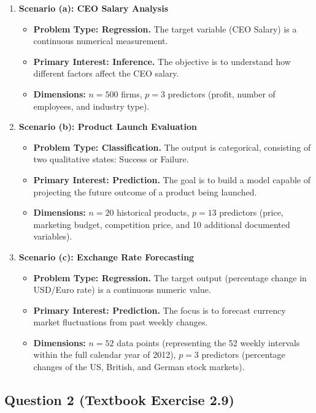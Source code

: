 \documentclass[12pt,a4paper]{article}
\begin{document}
\begin{enumerate}
\item \textbf{Scenario (a): CEO Salary Analysis}
\begin{itemize}
\item \textbf{Problem Type: Regression.} The target variable (CEO Salary) is a continuous numerical measurement.
\item \textbf{Primary Interest: Inference.} The objective is to understand how different factors affect the CEO salary.
\item \textbf{Dimensions:} $n=500$ firms, $p=3$ predictors (profit, number of employees, and industry type).
\end{itemize}

\item \textbf{Scenario (b): Product Launch Evaluation}
\begin{itemize}
\item \textbf{Problem Type: Classification.} The output is categorical, consisting of two qualitative states: Success or Failure.
\item \textbf{Primary Interest: Prediction.} The goal is to build a model capable of projecting the future outcome of a product being launched.
\item \textbf{Dimensions:} $n=20$ historical products, $p=13$ predictors (price, marketing budget, competition price, and 10 additional documented variables).
\end{itemize}

\item \textbf{Scenario (c): Exchange Rate Forecasting}
\begin{itemize}
\item \textbf{Problem Type: Regression.} The target output (percentage change in USD/Euro rate) is a continuous numeric value.
\item \textbf{Primary Interest: Prediction.} The focus is to forecast currency market fluctuations from past weekly changes.
\item \textbf{Dimensions:} $n=52$ data points (representing the 52 weekly intervals within the full calendar year of 2012), $p=3$ predictors (percentage changes of the US, British, and German stock markets).
\end{itemize}
\end{enumerate}

\subsection*{Question 2 (Textbook Exercise 2.9)}
\end{document}
